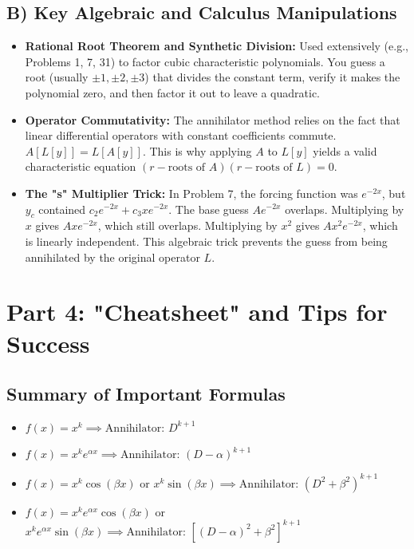 \documentclass[11pt]{article}
\begin{document}
\subsection{B) Key Algebraic and Calculus Manipulations}
\begin{itemize}
    \item \textbf{Rational Root Theorem and Synthetic Division:} Used extensively (e.g., Problems 1, 7, 31) to factor cubic characteristic polynomials. You guess a root (usually $\pm 1, \pm 2, \pm 3$) that divides the constant term, verify it makes the polynomial zero, and then factor it out to leave a quadratic.
    \item \textbf{Operator Commutativity:} The annihilator method relies on the fact that linear differential operators with constant coefficients commute. $A[L[y]] = L[A[y]]$. This is why applying $A$ to $L[y]$ yields a valid characteristic equation $(r - \text{roots of } A)(r - \text{roots of } L) = 0$.
    \item \textbf{The "s" Multiplier Trick:} In Problem 7, the forcing function was $e^{-2x}$, but $y_c$ contained $c_2 e^{-2x} + c_3 x e^{-2x}$. The base guess $A e^{-2x}$ overlaps. Multiplying by $x$ gives $A x e^{-2x}$, which still overlaps. Multiplying by $x^2$ gives $A x^2 e^{-2x}$, which is linearly independent. This algebraic trick prevents the guess from being annihilated by the original operator $L$.
\end{itemize}

\newpage
\section{Part 4: "Cheatsheet" and Tips for Success}

\subsection{Summary of Important Formulas}
\begin{tcolorbox}[colback=blue!5,colframe=blue!40!black,title=Annihilator Table]
\begin{itemize}
    \item $f(x) = x^k \implies \text{Annihilator: } D^{k+1}$
    \item $f(x) = x^k e^{\alpha x} \implies \text{Annihilator: } (D - \alpha)^{k+1}$
    \item $f(x) = x^k \cos(\beta x)$ or $x^k \sin(\beta x) \implies \text{Annihilator: } (D^2 + \beta^2)^{k+1}$
    \item $f(x) = x^k e^{\alpha x} \cos(\beta x)$ or $x^k e^{\alpha x} \sin(\beta x) \implies \text{Annihilator: } [(D - \alpha)^2 + \beta^2]^{k+1}$
\end{itemize}
\end{tcolorbox}
\end{document}
